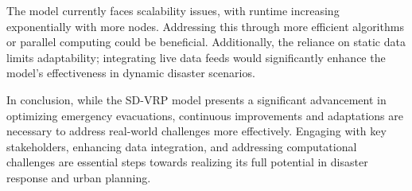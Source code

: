 \documentclass[12pt]{article}
\begin{document}
The model currently faces scalability issues, with runtime increasing exponentially with more nodes. Addressing this through more efficient algorithms or parallel computing could be beneficial. Additionally, the reliance on static data limits adaptability; integrating live data feeds would significantly enhance the model's effectiveness in dynamic disaster scenarios.

In conclusion, while the SD-VRP model presents a significant advancement in optimizing emergency evacuations, continuous improvements and adaptations are necessary to address real-world challenges more effectively. Engaging with key stakeholders, enhancing data integration, and addressing computational challenges are essential steps towards realizing its full potential in disaster response and urban planning.

\newpage
\end{document}
